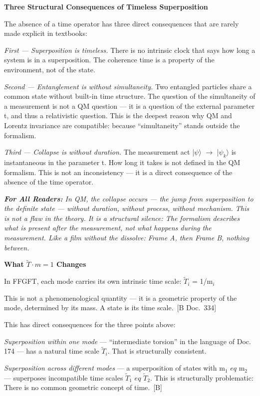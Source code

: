 \documentclass[11pt,oneside]{book}
\newcommand{\status}[1]{\penalty10000\,{\scriptsize\textcolor{gray!60}{[#1]}}}
\newenvironment{laierspur}{%
  \par\vspace{4pt}%
  \noindent\small\itshape\color{blue!60!black}%
  \textbf{For All Readers:}\enspace\ignorespaces}{%
  \par\vspace{4pt}\normalsize\normalfont\normalcolor}
\begin{document}
\textbf{Three Structural Consequences of Timeless Superposition}

The absence of a time operator has three direct consequences that are rarely
made explicit in textbooks:

\textit{First — Superposition is timeless.} There is no intrinsic clock that
says how long a system is in a superposition. The coherence time is a
property of the environment, not of the state.

\textit{Second — Entanglement is without simultaneity.} Two entangled
particles share a common state without built-in time structure. The question
of the simultaneity of a measurement is not a QM question — it is a question
of the external parameter t, and thus a relativistic question. This is the
deepest reason why QM and Lorentz invariance are compatible: because
\enquote{simultaneity} stands outside the formalism.

\textit{Third — Collapse is without duration.} The measurement act
|$\psi\rangle$ $\to$ |$\psi_k\rangle$ is instantaneous in the parameter t. How long it takes
is not defined in the QM formalism. This is not an inconsistency — it is a
direct consequence of the absence of the time operator.

\begin{laierspur}
In QM, the collapse occurs — the jump from superposition to the definite
state — without duration, without process, without mechanism. This is not a
flaw in the theory. It is a structural silence: The formalism describes what
is present after the measurement, not what happens during the measurement.
Like a film without the dissolve: Frame A, then Frame B, nothing between.
\end{laierspur}

\textbf{What $\tilde{T}\cdot m=1$ Changes}

In FFGFT, each mode carries its own intrinsic time scale:
$\tilde{T}_i$ = 1/m$_i$

This is not a phenomenological quantity — it is a geometric property of the
mode, determined by its mass. A state is its time scale. \status{B Doc.~334}

This has direct consequences for the three points above:

\textit{Superposition within one mode} — \enquote{intermediate torsion} in the
language of Doc. 174 — has a natural time scale $\tilde{T}_i$. That is
structurally consistent.

\textit{Superposition across different modes} — a superposition of states
with m$_1$ $
eq$ m$_2$ — superposes incompatible time scales
$\tilde{T}_1$ $
eq$ $\tilde{T}_2$. This is structurally problematic: There is no
common geometric concept of time. \status{B}
\end{document}
